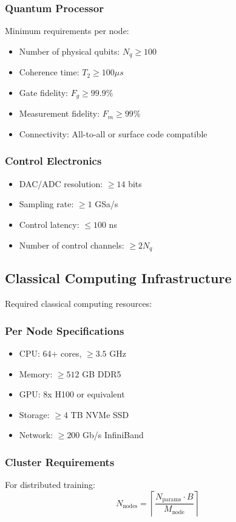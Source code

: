 \documentclass{article}
\begin{document}
\subsubsection{Quantum Processor}
Minimum requirements per node:
\begin{itemize}
\item Number of physical qubits: $N_q \geq 100$
\item Coherence time: $T_2 \geq 100\mu s$
\item Gate fidelity: $F_g \geq 99.9\%$
\item Measurement fidelity: $F_m \geq 99\%$
\item Connectivity: All-to-all or surface code compatible
\end{itemize}

\subsubsection{Control Electronics}
\begin{itemize}
\item DAC/ADC resolution: $\geq 14$ bits
\item Sampling rate: $\geq 1$ GSa/s
\item Control latency: $\leq 100$ ns
\item Number of control channels: $\geq 2N_q$
\end{itemize}

\subsection{Classical Computing Infrastructure}
Required classical computing resources:

\subsubsection{Per Node Specifications}
\begin{itemize}
\item CPU: 64+ cores, $\geq 3.5$ GHz
\item Memory: $\geq 512$ GB DDR5
\item GPU: 8x H100 or equivalent
\item Storage: $\geq 4$ TB NVMe SSD
\item Network: $\geq 200$ Gb/s InfiniBand
\end{itemize}

\subsubsection{Cluster Requirements}
For distributed training:
\begin{equation}
N_{\text{nodes}} = \left\lceil\frac{N_{\text{params}} \cdot B}{M_{\text{node}}}\right\rceil
\end{equation}
\end{document}
